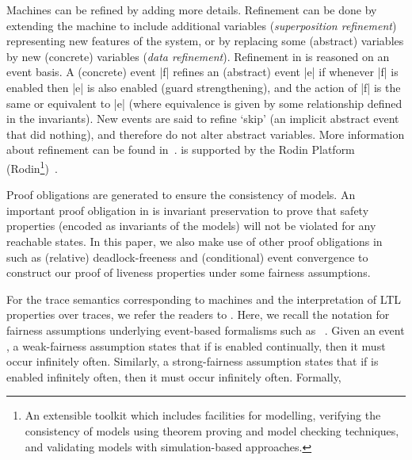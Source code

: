 Machines can be refined by adding more details.  Refinement can be done by extending the machine 
to include additional variables (\emph{superposition refinement}) representing new features of 
the system, or by replacing some (abstract) variables by new (concrete) variables (\emph{data refinement}).  
Refinement in \EventB is reasoned on an event basis.  
A (concrete) event |f| refines an (abstract) event |e| if whenever |f| is enabled then |e| is also enabled (guard strengthening), and the action of |f| is the same or equivalent to |e| (where equivalence is given by some relationship defined in the invariants). 
New events are said to refine `skip' (an implicit abstract event that did nothing), and therefore do not alter abstract variables.
 More information about \EventB refinement can be
found in~\cite{abrial10:_model_event_b}.
\EventB is supported by the Rodin Platform (Rodin\footnote{An extensible toolkit which includes 
facilities for modelling, verifying the consistency of models using theorem proving and model 
checking techniques, and validating models with simulation-based approaches.})~\cite{abrial10:_rodin}.

Proof obligations are generated to ensure the consistency of
\mbox{\EventB} models.  An important proof obligation in
\mbox{\EventB} is invariant preservation to prove that safety
properties (encoded as invariants of the models) will not be
violated for any reachable states.  In this paper, we also make use
of other proof obligations in \mbox{\EventB} such as (relative)
deadlock-freeness and (conditional) event convergence to construct
our proof of liveness properties under some fairness
assumptions.%


For the trace semantics corresponding to \mbox{\EventB} machines and
the interpretation of LTL properties over traces, we refer the readers
to \mbox{\cite{hoang2016ltl}}.  Here, we recall the notation for
fairness assumptions underlying event-based formalisms such as
\mbox{\EventB~\cite{lamport1977proving,hudon16:_unit_b_method}}. Given
an event \mbox{}, a weak-fairness assumption
\mbox{} states that if \mbox{}
is enabled continually, then it must occur infinitely often.
Similarly, a strong-fairness assumption \mbox{}
states that if \mbox{} is enabled infinitely often,
then it must occur infinitely often. Formally,

